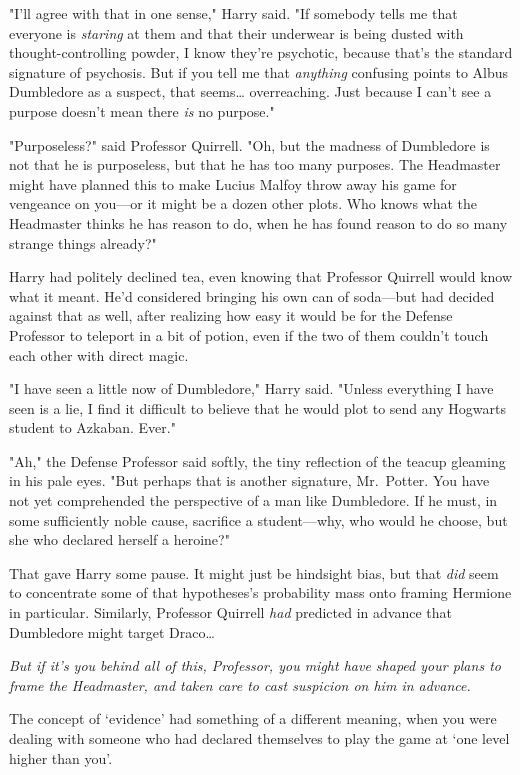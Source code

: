 "I'll agree with that in one sense," Harry said. "If somebody tells me that
everyone is \emph{staring} at them and that their underwear is being dusted
with thought-controlling powder, I know they're psychotic, because that's the
standard signature of psychosis. But if you tell me that \emph{anything}
confusing points to Albus Dumbledore as a suspect, that seems{\ldots}
overreaching. Just because I can't see a purpose doesn't mean there \emph{is}
no purpose."

"Purposeless?" said Professor Quirrell. "Oh, but the madness of Dumbledore is
not that he is purposeless, but that he has too many purposes. The Headmaster
might have planned this to make Lucius Malfoy throw away his game for vengeance
on you---or it might be a dozen other plots. Who knows what the Headmaster
thinks he has reason to do, when he has found reason to do so many strange
things already?"

Harry had politely declined tea, even knowing that Professor Quirrell would
know what it meant. He'd considered bringing his own can of soda---but had
decided against that as well, after realizing how easy it would be for the
Defense Professor to teleport in a bit of potion, even if the two of them
couldn't touch each other with direct magic.

"I have seen a little now of Dumbledore," Harry said. "Unless everything I have
seen is a lie, I find it difficult to believe that he would plot to send any
Hogwarts student to Azkaban. Ever."

"Ah," the Defense Professor said softly, the tiny reflection of the teacup
gleaming in his pale eyes. "But perhaps that is another signature, Mr.~Potter.
You have not yet comprehended the perspective of a man like Dumbledore. If he
must, in some sufficiently noble cause, sacrifice a student---why, who would he
choose, but she who declared herself a heroine?"

That gave Harry some pause. It might just be hindsight bias, but that
\emph{did} seem to concentrate some of that hypotheses's probability mass onto
framing Hermione in particular. Similarly, Professor Quirrell \emph{had}
predicted in advance that Dumbledore might target Draco{\ldots}

\emph{But if it's you behind all of this, Professor, you might have shaped your
plans to frame the Headmaster, and taken care to cast suspicion on him in
advance.}

The concept of `evidence' had something of a different meaning, when you were
dealing with someone who had declared themselves to play the game at `one level
higher than you'.

